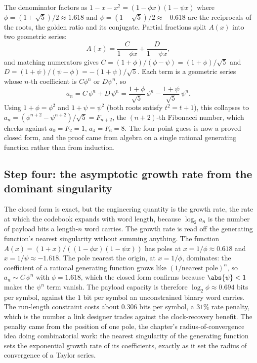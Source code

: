 The denominator factors as $1 - x - x^{2} = (1 - \phi x)(1 - \psi x)$
where $\phi = (1 + \sqrt 5)/2 \approx 1.618$ and $\psi = (1 - \sqrt
5)/2 \approx -0.618$ are the reciprocals of the roots, the golden ratio
and its conjugate. Partial fractions split $A(x)$ into two geometric
series:
\[
A(x) = \frac{C}{1 - \phi x} + \frac{D}{1 - \psi x},
\]
and matching numerators gives $C = (1 + \phi)/(\phi - \psi) = (1 +
\phi)/\sqrt 5$ and $D = (1 + \psi)/(\psi - \phi) = -(1 + \psi)/\sqrt 5$.
Each term is a geometric series whose $n$-th coefficient is $C\phi^{n}$
or $D\psi^{n}$, so
\[
a_{n} = C\,\phi^{n} + D\,\psi^{n} = \frac{1 + \phi}{\sqrt 5}\,\phi^{n}
- \frac{1 + \psi}{\sqrt 5}\,\psi^{n}.
\]
Using $1 + \phi = \phi^{2}$ and $1 + \psi = \psi^{2}$ (both roots
satisfy $t^{2} = t + 1$), this collapses to $a_{n} = (\phi^{n+2} -
\psi^{n+2})/\sqrt 5 = F_{n+2}$, the $(n+2)$-th Fibonacci number, which
checks against $a_{0} = F_{2} = 1$, $a_{4} = F_{6} = 8$. The four-point
guess is now a proved closed form, and the proof came from algebra on a
single rational generating function rather than from induction.

\subsection{Step four: the asymptotic growth rate from the dominant
singularity}

The closed form is exact, but the engineering quantity is the growth
rate, the rate at which the codebook expands with word length, because
$\log_{2} a_{n}$ is the number of payload bits a length-$n$ word
carries. The growth rate is read off the generating function's nearest
singularity without summing anything. The function $A(x) = (1 + x)/((1 -
\phi x)(1 - \psi x))$ has poles at $x = 1/\phi \approx 0.618$ and $x =
1/\psi \approx -1.618$. The pole nearest the origin, at $x = 1/\phi$,
dominates: the coefficient of a rational generating function grows like
$(1/\text{nearest pole})^{n}$, so $a_{n} \sim C\,\phi^{n}$ with $\phi =
1.618$, which the closed form confirms because $\abs{\psi} < 1$ makes
the $\psi^{n}$ term vanish. The payload capacity is therefore $\log_{2}
\phi \approx 0.694$ bits per symbol, against the $1$ bit per symbol an
unconstrained binary word carries. The run-length constraint costs about
$0.306$ bits per symbol, a $31\%$ rate penalty, which is the number a
link designer trades against the clock-recovery benefit. The penalty
came from the position of one pole, the chapter's radius-of-convergence
idea doing combinatorial work: the nearest singularity of the generating
function sets the exponential growth rate of its coefficients, exactly as
it set the radius of convergence of a Taylor series.

